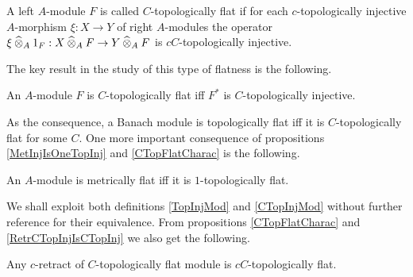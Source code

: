 \begin{definition}\label{CTopFlatMod} A left $A$-module $F$ is called $C$-topologically flat if for each $c$-topologically injective $A$-morphism $\xi:X\to Y$ of right $A$-modules the operator $\xi\mathbin{\widehat{\otimes}}_{A} 1_F:X\mathbin{\widehat{\otimes}}_{A} F\to Y\mathbin{\widehat{\otimes}}_{A} F$ is $cC$-topologically injective.
\end{definition}

The key result in the study of this type of flatness is the following.

\begin{proposition}\label{CTopFlatCharac} An $A$-module $F$ is $C$-topologically flat iff $F^*$ is $C$-topologically injective.
\end{proposition}

As the consequence, a Banach module is topologically flat iff it is $C$-topologically flat for some $C$. One more important consequence of propositions \ref{MetInjIsOneTopInj} and \ref{CTopFlatCharac} is the following.

\begin{proposition}\label{MetFlatIsOneTopFlat} An $A$-module is metrically flat iff it is $1$-topologically flat.
\end{proposition}


We shall exploit both definitions \ref{TopInjMod} and \ref{CTopInjMod} without further reference for their equivalence. From propositions \ref{CTopFlatCharac} and \ref{RetrCTopInjIsCTopInj} we also get the following.

\begin{proposition}\label{RetrCTopFlatIsCTopFlat} Any $c$-retract of $C$-topologically flat module is $cC$-topologically flat.
\end{proposition}

